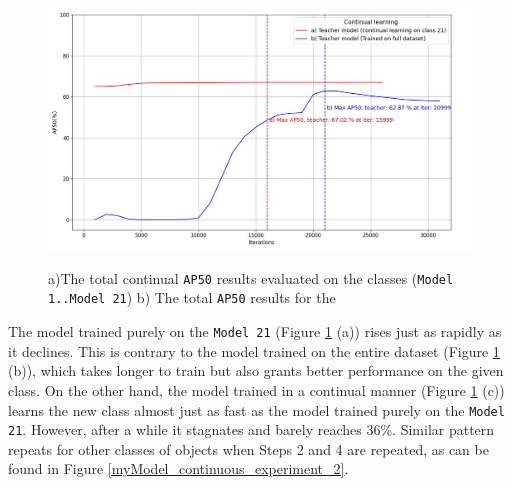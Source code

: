 \documentclass[english, 12pt, a4paper, elec, utf8, a-1b, online]{aaltothesis}
\begin{document}
\begin{figure}[htb]
	\begin{center}
		\includegraphics[width=14cm]{./AP50_continual_21_allClasses.jpg}
	\end{center}
	\caption{a)The total continual \texttt{AP50} results evaluated on the classes (\texttt{Model 1..Model 21}) b) The total \texttt{AP50} results for the }
	\begin{center}
	\label{myModel_continuous_experiment_3}
	\end{center}
\end{figure}
\FloatBarrier 

The model trained purely on the \texttt{Model 21} (Figure \ref{myModel_continuous_experiment_3} (a))  rises just as rapidly as it declines. This is contrary to the model trained on the entire dataset (Figure \ref{myModel_continuous_experiment_3} (b)), which takes longer to train but also grants better performance on the given class. On the other hand, the model trained in a continual manner (Figure \ref{myModel_continuous_experiment_3} (c)) learns the new class almost just as fast as the model trained purely on the \texttt{Model 21}. However, after a while it stagnates and barely reaches 36\%. Similar pattern repeats for other classes of objects when Steps 2 and 4 are repeated, as can be found in Figure \ref{myModel_continuous_experiment_2}.
\end{document}
